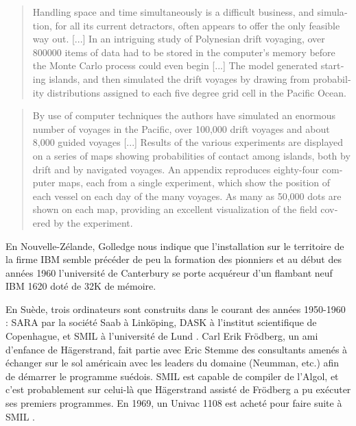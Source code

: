 \foreignblockquote{english}[\cite{Gould1970}]{Handling space and time simultaneously is a difficult business, and simulation, for all its current detractors, often appears to offer the only feasible way out. [...] In an intriguing study of Polynesian drift voyaging, over 800000 items of data had to be stored in the computer’s memory before the Monte Carlo process could even begin [...] The model generated starting islands, and then simulated the drift voyages by drawing from probability distributions assigned to each five degree grid cell in the Pacific Ocean.}

\foreignblockquote{english}[\cite{Doran1974}]{ By use of computer techniques the authors have simulated an enormous number of voyages in the Pacific, over 100,000 drift voyages and about 8,000 guided voyages [...] Results of the various experiments are displayed on a series of maps showing probabilities of contact among islands, both by drift and by navigated voyages. An appendix reproduces eighty-four computer maps, each from a single experiment, which show the position of each vessel on each day of the many voyages. As many as 50,000 dots are shown on each map, providing an excellent visualization of the field covered by the experiment.}


En Nouvelle-Zélande, Golledge nous indique que l'installation sur le territoire de la firme IBM semble précéder de peu la formation des pionniers \autocite[94]{Bailly2000} et au début des années 1960 l'université de Canterbury se porte acquéreur d'un flambant neuf IBM 1620 doté de 32K de mémoire.


En Suède, trois ordinateurs sont construits dans le courant des années 1950-1960 : SARA par la société Saab à Linköping, DASK à l'institut scientifique de Copenhague, et SMIL à l'université de Lund \autocite{Persson2007}. Carl Erik Frödberg, un ami d'enfance de Hägerstrand, fait partie avec Eric Stemme des consultants amenés à échanger sur le sol américain avec les leaders du domaine (Neumman, etc.) afin de démarrer le programme suédois.  SMIL est capable de compiler de l'Algol, et c'est probablement sur celui-là que Hägerstrand assisté de Frödberg a pu exécuter ses premiers programmes. En 1969, un Univac 1108 est acheté pour faire suite à SMIL \autocite[33-34]{Lindgren2008}.

